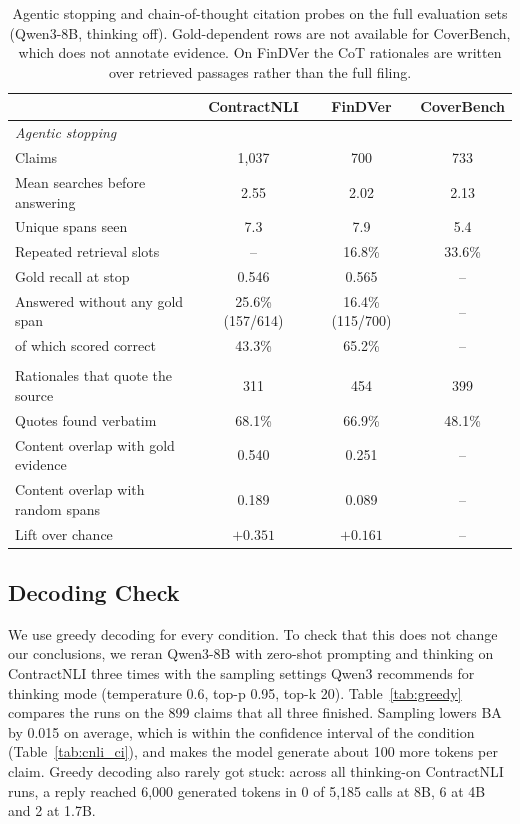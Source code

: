 \documentclass[11pt]{article}
\begin{document}
\begin{table}[H]
\centering
\footnotesize
\setlength{\tabcolsep}{6pt}
\begin{tabular}{lccc}
\toprule
& \textbf{ContractNLI} & \textbf{FinDVer} & \textbf{CoverBench} \\
\midrule
\multicolumn{4}{l}{\textit{Agentic stopping}} \\
\quad Claims                          & 1{,}037 & 700 & 733 \\
\quad Mean searches before answering  & 2.55 & 2.02 & 2.13 \\
\quad Unique spans seen               & 7.3 & 7.9 & 5.4 \\
\quad Repeated retrieval slots        & --  & 16.8\% & 33.6\% \\
\quad Gold recall at stop             & 0.546 & 0.565 & -- \\
\quad Answered without any gold span  & 25.6\% (157/614) & 16.4\% (115/700) & -- \\
\quad \quad of which scored correct   & 43.3\% & 65.2\% & -- \\
\addlinespace[2pt]
\multicolumn{4}{l}{\textit{CoT citations}} \\
\quad Rationales that quote the source & 311 & 454 & 399 \\
\quad Quotes found verbatim            & 68.1\% & 66.9\% & 48.1\% \\
\quad Content overlap with gold evidence    & 0.540 & 0.251 & -- \\
\quad Content overlap with random spans     & 0.189 & 0.089 & -- \\
\quad Lift over chance                      & $+0.351$ & $+0.161$ & -- \\
\bottomrule
\end{tabular}
\caption{Agentic stopping and chain-of-thought citation probes on the full
evaluation sets (Qwen3-8B, thinking off). Gold-dependent rows are not
available for CoverBench, which does not annotate evidence. On FinDVer the
CoT rationales are written over retrieved passages rather than the full
filing.}
\label{tab:faith_probes}
\end{table}

\subsection{Decoding Check}
\label{sec:decoding}

We use greedy decoding for every condition. To check that this does not
change our conclusions, we reran Qwen3-8B with zero-shot prompting and
thinking on ContractNLI three times with the sampling settings Qwen3
recommends for thinking mode (temperature 0.6, top-p 0.95, top-k 20).
Table~\ref{tab:greedy} compares the runs on the 899 claims that all three
finished. Sampling lowers BA by 0.015 on average, which is within the
confidence interval of the condition (Table~\ref{tab:cnli_ci}), and makes
the model generate about 100 more tokens per claim. Greedy decoding also
rarely got stuck: across all thinking-on ContractNLI runs, a reply reached
6{,}000 generated tokens in 0 of 5{,}185 calls at 8B, 6 at 4B and 2 at
1.7B.
\end{document}
